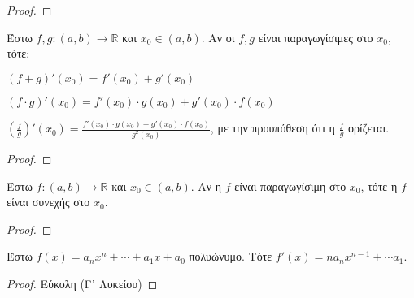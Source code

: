 \documentclass[main.tex]{subfiles}
\begin{document}
            \begin{proof}

            \end{proof}

            \begin{examples}
            \end{examples}

            \begin{thm}
                Έστω $ f,g \colon (a,b) \to \mathbb{R} $ και $ x_{0} \in (a,b) $. Αν οι $ f,g $ 
                είναι παραγωγίσιμες στο $ x_{0} $, τότε:
                \begin{myitemize}
                \item $ (f+g)'(x_{0}) = f'(x_{0}) + g'(x_{0})$
                \item $ (f\cdot g)'(x_{0}) = f'(x_{0}) \cdot g(x_{0}) + g'(x_{0})\cdot f(x_{0}) $
                \item $ \left(\frac{f}{g}\right)'(x_{0}) = \frac{f'(x_{0})
                    \cdot g(x_{0}) - g'(x_{0})\cdot f(x_{0})}{g^{2}(x_{0})} $,
                    με την προυπόθεση ότι η $ \frac{f}{g} $ ορίζεται.
                \end{myitemize}
            \end{thm}

            \begin{proof}

            \end{proof}

            \begin{prop}
                Έστω $ f \colon (a,b) \to \mathbb{R} $ και $ x_{0} \in (a,b) $. Αν η $f$ είναι 
                παραγωγίσιμη στο $ x_{0} $, τότε η $f$ είναι συνεχής στο $ x_{0} $.
            \end{prop}

            \begin{proof}

            \end{proof}

            \begin{prop}
                Έστω $ f(x) = a_{n}x^{n} + \cdots + a_{1}x + a_{0} $ πολυώνυμο. Τότε 
                $ f'(x) = n a_{n}x^{n-1} + \cdots a_{1} $.
            \end{prop}

            \begin{proof}
                Εύκολη (Γ᾽ Λυκείου)
            \end{proof}
\end{document}
